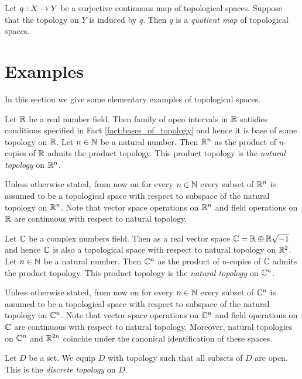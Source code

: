 \begin{definition}
	Let $q:X \rightarrow Y$ be a surjective continuous map of topological spaces. Suppose that the topology on $Y$ is induced by $q$. Then $q$ is a \textit{quotient map} of topological spaces.
\end{definition}

\section{Examples}
\noindent
In this section we give some elementary examples of topological spaces.

\begin{example}\label{example:real_line_and_its_products}
	Let ${\mathbb R}$ be a real number field. Then family of open intervals in ${\mathbb R}$ satisfies conditions specified in Fact \ref{fact:bases_of_topology} and hence it is base of some topology on ${\mathbb R}$. Let $n \in {\mathbb N}$ be a natural number. Then ${\mathbb R}^n$ as the product of $n$-copies of ${\mathbb R}$ admits the product topology. This product topology is the \textit{natural topology} on ${\mathbb R}^n$.
\end{example}
\noindent
Unless otherwise stated, from now on for every $n \in {\mathbb N}$ every subset of ${\mathbb R}^n$ is assumed to be a topological space with respect to subspace of the natural topology on ${\mathbb R}^n$. Note that vector space operations on ${\mathbb R}^n$ and field operations on ${\mathbb R}$ are continuous with respect to natural topology.

\begin{example}\label{example:complex_numbers}
	Let ${\mathbb C}$ be a complex numbers field. Then as a real vector space ${\mathbb C} = {\mathbb R} \oplus {\mathbb R}\sqrt{-1}$ and hence ${\mathbb C}$ is also a topological space with respect to natural topology on ${\mathbb R}^2$. Let $n \in {\mathbb N}$ be a natural number. Then ${\mathbb C}^n$ as the product of $n$-copies of ${\mathbb C}$ admits the product topology. This product topology is the \textit{natural topology} on ${\mathbb C}^n$.
\end{example}
\noindent
Unless otherwise stated, from now on for every $n \in {\mathbb N}$ every subset of ${\mathbb C}^n$ is assumed to be a topological space with respect to subspace of the natural topology on ${\mathbb C}^n$. Note that vector space operations on ${\mathbb C}^n$ and field operations on ${\mathbb C}$ are continuous with respect to natural topology. Moreover, natural topologies on ${\mathbb C}^n$ and ${\mathbb R}^{2n}$ coincide under the canonical identification of these spaces.

\begin{example}\label{example:discrete_topology}
	Let $D$ be a set. We equip $D$ with topology such that all subsets of $D$ are open. This is the \textit{discrete topology} on $D$.
\end{example}

